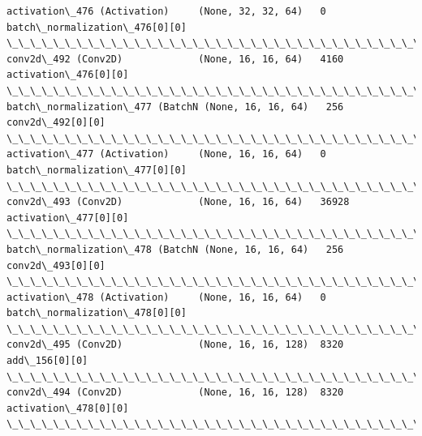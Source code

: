 \documentclass[11pt]{article}
\begin{document}
\begin{Verbatim}[commandchars=\\\{\}]
activation\_476 (Activation)     (None, 32, 32, 64)   0           batch\_normalization\_476[0][0]    
\_\_\_\_\_\_\_\_\_\_\_\_\_\_\_\_\_\_\_\_\_\_\_\_\_\_\_\_\_\_\_\_\_\_\_\_\_\_\_\_\_\_\_\_\_\_\_\_\_\_\_\_\_\_\_\_\_\_\_\_\_\_\_\_\_\_\_\_\_\_\_\_\_\_\_\_\_\_\_\_\_\_\_\_\_\_\_\_\_\_\_\_\_\_\_\_\_\_
conv2d\_492 (Conv2D)             (None, 16, 16, 64)   4160        activation\_476[0][0]             
\_\_\_\_\_\_\_\_\_\_\_\_\_\_\_\_\_\_\_\_\_\_\_\_\_\_\_\_\_\_\_\_\_\_\_\_\_\_\_\_\_\_\_\_\_\_\_\_\_\_\_\_\_\_\_\_\_\_\_\_\_\_\_\_\_\_\_\_\_\_\_\_\_\_\_\_\_\_\_\_\_\_\_\_\_\_\_\_\_\_\_\_\_\_\_\_\_\_
batch\_normalization\_477 (BatchN (None, 16, 16, 64)   256         conv2d\_492[0][0]                 
\_\_\_\_\_\_\_\_\_\_\_\_\_\_\_\_\_\_\_\_\_\_\_\_\_\_\_\_\_\_\_\_\_\_\_\_\_\_\_\_\_\_\_\_\_\_\_\_\_\_\_\_\_\_\_\_\_\_\_\_\_\_\_\_\_\_\_\_\_\_\_\_\_\_\_\_\_\_\_\_\_\_\_\_\_\_\_\_\_\_\_\_\_\_\_\_\_\_
activation\_477 (Activation)     (None, 16, 16, 64)   0           batch\_normalization\_477[0][0]    
\_\_\_\_\_\_\_\_\_\_\_\_\_\_\_\_\_\_\_\_\_\_\_\_\_\_\_\_\_\_\_\_\_\_\_\_\_\_\_\_\_\_\_\_\_\_\_\_\_\_\_\_\_\_\_\_\_\_\_\_\_\_\_\_\_\_\_\_\_\_\_\_\_\_\_\_\_\_\_\_\_\_\_\_\_\_\_\_\_\_\_\_\_\_\_\_\_\_
conv2d\_493 (Conv2D)             (None, 16, 16, 64)   36928       activation\_477[0][0]             
\_\_\_\_\_\_\_\_\_\_\_\_\_\_\_\_\_\_\_\_\_\_\_\_\_\_\_\_\_\_\_\_\_\_\_\_\_\_\_\_\_\_\_\_\_\_\_\_\_\_\_\_\_\_\_\_\_\_\_\_\_\_\_\_\_\_\_\_\_\_\_\_\_\_\_\_\_\_\_\_\_\_\_\_\_\_\_\_\_\_\_\_\_\_\_\_\_\_
batch\_normalization\_478 (BatchN (None, 16, 16, 64)   256         conv2d\_493[0][0]                 
\_\_\_\_\_\_\_\_\_\_\_\_\_\_\_\_\_\_\_\_\_\_\_\_\_\_\_\_\_\_\_\_\_\_\_\_\_\_\_\_\_\_\_\_\_\_\_\_\_\_\_\_\_\_\_\_\_\_\_\_\_\_\_\_\_\_\_\_\_\_\_\_\_\_\_\_\_\_\_\_\_\_\_\_\_\_\_\_\_\_\_\_\_\_\_\_\_\_
activation\_478 (Activation)     (None, 16, 16, 64)   0           batch\_normalization\_478[0][0]    
\_\_\_\_\_\_\_\_\_\_\_\_\_\_\_\_\_\_\_\_\_\_\_\_\_\_\_\_\_\_\_\_\_\_\_\_\_\_\_\_\_\_\_\_\_\_\_\_\_\_\_\_\_\_\_\_\_\_\_\_\_\_\_\_\_\_\_\_\_\_\_\_\_\_\_\_\_\_\_\_\_\_\_\_\_\_\_\_\_\_\_\_\_\_\_\_\_\_
conv2d\_495 (Conv2D)             (None, 16, 16, 128)  8320        add\_156[0][0]                    
\_\_\_\_\_\_\_\_\_\_\_\_\_\_\_\_\_\_\_\_\_\_\_\_\_\_\_\_\_\_\_\_\_\_\_\_\_\_\_\_\_\_\_\_\_\_\_\_\_\_\_\_\_\_\_\_\_\_\_\_\_\_\_\_\_\_\_\_\_\_\_\_\_\_\_\_\_\_\_\_\_\_\_\_\_\_\_\_\_\_\_\_\_\_\_\_\_\_
conv2d\_494 (Conv2D)             (None, 16, 16, 128)  8320        activation\_478[0][0]             
\_\_\_\_\_\_\_\_\_\_\_\_\_\_\_\_\_\_\_\_\_\_\_\_\_\_\_\_\_\_\_\_\_\_\_\_\_\_\_\_\_\_\_\_\_\_\_\_\_\_\_\_\_\_\_\_\_\_\_\_\_\_\_\_\_\_\_\_\_\_\_\_\_\_\_\_\_\_\_\_\_\_\_\_\_\_\_\_\_\_\_\_\_\_\_\_\_\_

\end{Verbatim}
\end{document}
